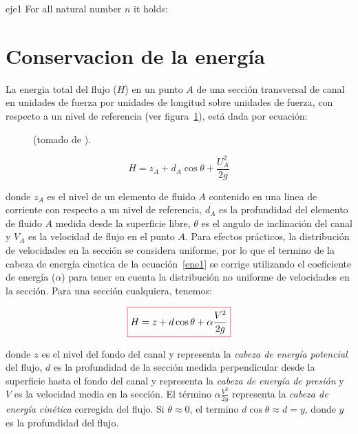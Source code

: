 \documentclass[11pt, oneside]{article}
\begin{document}
\begin{eje}{}{eje1}
  For all natural number $n$ it holds:
\end{eje}


\section{Conservacion de la energ\'ia}%
La energia total del flujo ($H$) en un punto $A$ de una secci\'on transversal de canal en unidades de fuerza por unidades de longitud sobre unidades de fuerza, con respecto a un nivel de referencia (ver figura~\ref{fig9}), est\'a dada por ecuaci\'on:

\begin{figure}[h]
\centering
\caption{(tomado de \cite{VChow}).}
\label{fig9}
\end{figure}

\begin{equation}
H = z_{A} + d_{A} \cos \theta + \frac{U_A^2}{2g} 
\label{ene1}
\end{equation}

donde $z_A$ es el  nivel de un elemento de fluido $A$ contenido en una linea de corriente con respecto a un nivel de referencia, $d_A$ es la profundidad del elemento de fluido $A$ medida desde la superficie libre, $\theta$ es el angulo de inclinaci\'on del canal y $V_A$ es la velocidad de flujo en el punto $A$. Para efectos pr\'acticos, la distribuci\'on de velocidades en la secci\'on se considera uniforme, por lo que el termino de la cabeza de energ\'ia cinetica de  la ecuaci\'on~\ref{ene1} se corrige utilizando el coeficiente de energ\'ia ($\alpha$) para tener en cuenta la distribuci\'on no uniforme de velocidades en la secci\'on. Para una secci\'on cualquiera, tenemos:

\begin{equation}
\color{red}\boxed{\color{black} H = z + d \cos \theta + \alpha\frac{V^2}{2g} }
\label{ene2}
\end{equation}

donde $z$ es el nivel del fondo del canal y representa la \emph{cabeza de energ\'ia potencial} del flujo, $d$ es la profundidad de la secci\'on medida perpendicular desde la superficie hasta el fondo del canal y representa la \emph{cabeza de energ\'ia de presi\'on} y $V$ es la velocidad media en la secci\'on. El t\'ermino $\alpha \frac{V^2}{2g}$ representa la \emph{cabeza de energ\'ia cin\'etica} corregida del flujo. Si $\theta \approx 0$, el termino $d \cos \theta \approx d = y$, donde $y$ es la profundidad del flujo. 
\end{document}
